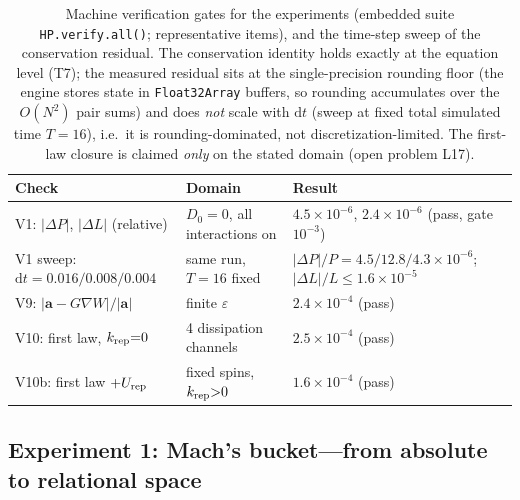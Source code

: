 \documentclass[aps,reprint,amsmath,amssymb,nofootinbib,superscriptaddress,floatfix]{revtex4-2}
\newcommand{\ud}{\mathrm{d}}
\newcommand{\vect}[1]{\bm{#1}}
\newcommand{\Dz}{D_0}
\begin{document}
\begin{table}[b]
\caption{\label{tab:verify}%
Machine verification gates for the experiments (embedded suite
\texttt{HP.verify.all()}; representative items), and the time-step
sweep of the conservation residual.
The conservation identity holds exactly at the equation level (T7);
the measured residual sits at the single-precision rounding floor (the
engine stores state in \texttt{Float32Array} buffers, so rounding
accumulates over the $O(N^2)$ pair sums) and
does \emph{not} scale with $\ud t$ (sweep at fixed total simulated
time $T = 16$), i.e.\ it is rounding-dominated, not
discretization-limited.
The first-law closure is claimed \emph{only} on the stated domain
(open problem L17).}
\begin{ruledtabular}
\begin{tabular}{p{}p{}p{}}
Check & Domain & Result \\
\hline
V1: $|\Delta P|$, $|\Delta L|$ (relative) &
$\Dz{=}0$, all interactions on & $4.5\times10^{-6}$,
$2.4\times10^{-6}$ (pass, gate $10^{-3}$) \\
V1 sweep: $\ud t{=}0.016/0.008/0.004$ &
same run, $T{=}16$ fixed & $|\Delta P|/P = 4.5/12.8/4.3
\times10^{-6}$; $|\Delta L|/L \le 1.6\times10^{-5}$ \\
V9: $|\vect{a}-G\nabla W|/|\vect{a}|$ &
finite $\varepsilon$ & $2.4\times10^{-4}$ (pass) \\
V10: first law, $k_{\rm rep}{=}0$ &
4 dissipation channels & $2.5\times10^{-4}$ (pass) \\
V10b: first law $+U_{\rm rep}$ &
fixed spins, $k_{\rm rep}{>}0$ & $1.6\times10^{-4}$ (pass) \\
\end{tabular}
\end{ruledtabular}
\end{table}

\subsection{Experiment 1: Mach's bucket---from absolute to relational
space}
\label{sec:exp1}
\end{document}
